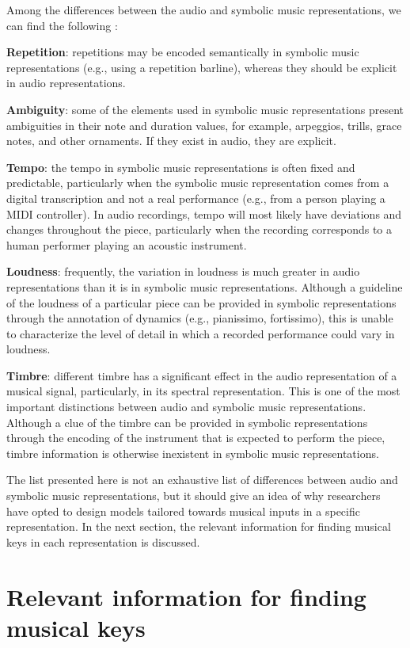 Among the differences between the audio and symbolic music representations, we can find the following \cite{fremerey2009towards}:

\textbf{Repetition}: repetitions may be encoded semantically in symbolic music representations (e.g., using a repetition barline), whereas they should be explicit in audio representations.

\textbf{Ambiguity}: some of the elements used in symbolic music representations present ambiguities in their note and duration values, for example, arpeggios, trills, grace notes, and other ornaments. If they exist in audio, they are explicit.

\textbf{Tempo}: the tempo in symbolic music representations is often fixed and predictable, particularly when the symbolic music representation comes from a digital transcription and not a real performance (e.g., from a person playing a MIDI controller). In audio recordings, tempo will most likely have deviations and changes throughout the piece, particularly when the recording corresponds to a human performer playing an acoustic instrument.

\textbf{Loudness}: frequently, the variation in loudness is much greater in audio representations than it is in symbolic music representations. Although a guideline of the loudness of a particular piece can be provided in symbolic representations through the annotation of dynamics (e.g., pianissimo, fortissimo), this is unable to characterize the level of detail in which a recorded performance could vary in loudness.

\textbf{Timbre}: different timbre has a significant effect in the audio representation of a musical signal, particularly, in its spectral representation. This is one of the most important distinctions between audio and symbolic music representations. Although a clue of the timbre can be provided in symbolic representations through the encoding of the instrument that is expected to perform the piece, timbre information is otherwise inexistent in symbolic music representations.

The list presented here is not an exhaustive list of differences between audio and symbolic music representations, but it should give an idea of why researchers have opted to design models tailored towards musical inputs in a specific representation. In the next section, the relevant information for finding musical keys in each representation is discussed.

\section{Relevant information for finding musical keys}

